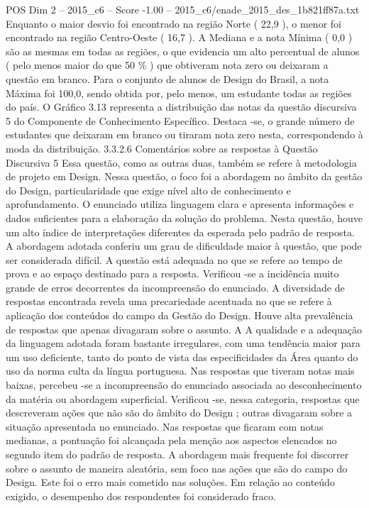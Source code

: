 \begin{textsample}{POS Dim 2 – 2015\_c6 – Score -1.00 – 2015\_c6/enade\_2015\_des\_1b821ff87a.txt}
Enquanto o maior desvio foi encontrado na região Norte ( 22,9 ), o menor foi encontrado na região Centro-Oeste ( 16,7 ).
A Mediana e a nota Mínima ( 0,0 ) são as mesmas em todas as regiões, o que evidencia um alto percentual de alunos ( pelo menos maior do que 50 \% ) que obtiveram nota zero ou deixaram a questão em branco.
Para o conjunto de alunos de Design do Brasil, a nota Máxima foi 100,0, sendo obtida por, pelo menos, um estudante todas as regiões do país.
O Gráfico 3.13 representa a distribuição das notas da questão discursiva 5 do Componente de Conhecimento Específico.
Destaca -se, o grande número de estudantes que deixaram em branco ou tiraram nota zero nesta, correspondendo à moda da distribuição. 3.3.2.6 Comentários sobre as respostas à Questão Discursiva 5 Essa questão, como as outras duas, também se refere à metodologia de projeto em Design.
Nessa questão, o foco foi a abordagem no âmbito da gestão do Design, particularidade que exige nível alto de conhecimento e aprofundamento.
O enunciado utiliza linguagem clara e apresenta informações e dados suficientes para a elaboração da solução do problema.
Nesta questão, houve um alto índice de interpretações diferentes da esperada pelo padrão de resposta.
A abordagem adotada conferiu um grau de dificuldade maior à questão, que pode ser considerada difícil.
A questão está adequada no que se refere ao tempo de prova e ao espaço destinado para a resposta.
Verificou -se a incidência muito grande de erros decorrentes da incompreensão do enunciado.
A diversidade de respostas encontrada revela uma precariedade acentuada no que se refere à aplicação dos conteúdos do campo da Gestão do Design.
Houve alta prevalência de respostas que apenas divagaram sobre o assunto.
A A qualidade e a adequação da linguagem adotada foram bastante irregulares, com uma tendência maior para um uso deficiente, tanto do ponto de vista das especificidades da Área quanto do uso da norma culta da língua portuguesa.
Nas respostas que tiveram notas mais baixas, percebeu -se a incompreensão do enunciado associada ao desconhecimento da matéria ou abordagem superficial.
Verificou -se, nessa categoria, respostas que descreveram ações que não são do âmbito do Design ; outras divagaram sobre a situação apresentada no enunciado.
Nas respostas que ficaram com notas medianas, a pontuação foi alcançada pela menção aos aspectos elencados no segundo item do padrão de resposta.
A abordagem mais frequente foi discorrer sobre o assunto de maneira aleatória, sem foco nas ações que são do campo do Design.
Este foi o erro mais cometido nas soluções.
Em relação ao conteúdo exigido, o desempenho dos respondentes foi considerado fraco.

\end{textsample}
